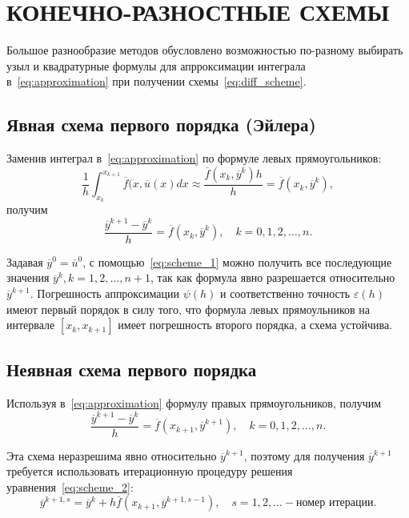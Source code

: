 \section[Конечно-разностные схемы]{КОНЕЧНО-РАЗНОСТНЫЕ СХЕМЫ}

Большое разнообразие методов обусловлено возможностью
по-разному выбирать узыл и квадратурные формулы для апрроксимации интеграла
в~\eqref{eq:approximation} при получении схемы~\eqref{eq:diff_scheme}.

\subsection{Явная схема первого порядка (Эйлера)}

Заменив интеграл в~\eqref{eq:approximation} по формуле левых прямоугольников:
\begin{equation*}
  \dfrac{1}{h} \int^{x_{k+1}}_{x_k} \overline{f}(x, \overline{u}(x) dx \approx
  \dfrac{\overline{f}(x_k, \overline{y}^k) h}{h} =
  \overline{f}(x_k, \overline{y}^k),
\end{equation*}
получим
\begin{equation}
  \dfrac{\overline{y}^{k+1} - \overline{y}^k}{h} =
  \overline{f}(x_k, \overline{y}^k), \quad
  k = 0, 1, 2, \ldots, n.
  \label{eq:scheme_1}
\end{equation}

Задавая \( \overline{y}^0 = \overline{u}^0 \), с помощью~\eqref{eq:scheme_1}
можно получить все последующие значения
\( \overline{y}^k, k = 1, 2, \ldots, n+1 \), так как формула явно разрешается
относительно \( \overline{y}^{k+1} \).
Погрешность аппроксимации \( \psi(h) \) и соответственно точность
\( \varepsilon(h) \) имеют первый порядок в силу того,
что формула левых прямоульников на интервале
\( [x_k, x_{k+1}] \) имеет погрешность второго порядка, а схема устойчива.

\subsection{Неявная схема первого порядка}

Используя в~\eqref{eq:approximation} формулу правых прямоугольников, получим
\begin{equation}
  \dfrac{\overline{y}^{k+1} - \overline{y}^k}{h} =
  \overline{f}(x_{k+1}, \overline{y}^{k+1}), \quad
  k = 0, 1, 2, \ldots, n.
  \label{eq:scheme_2}
\end{equation}

Эта схема неразрешима явно относительно \( \overline{y}^{k+1} \),
поэтому для получения \( \overline{y}^{k+1} \) требуется использовать итерационную
процедуру решения уравнения~\eqref{eq:scheme_2}:
\begin{equation}
  \overline{y}^{k+1, s} = \overline{y}^k +
  h \overline{f}(x_{k+1}, \overline{y}^{k+1, s-1}), \quad
  s = 1, 2, \ldots - \text{номер итерации}.
\end{equation}

